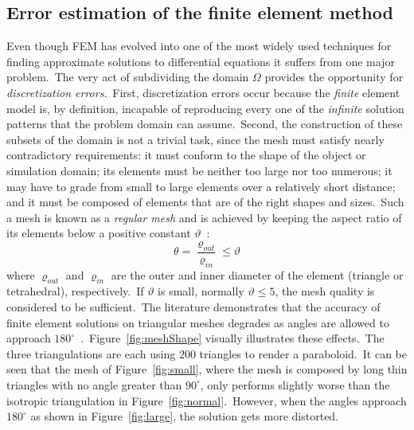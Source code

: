 \subsection{Error estimation of the finite element method}
\label{sec:errorEstimationOfTheFiniteelementMethod}
Even though FEM has evolved into one of the most widely used techniques for finding approximate solutions to differential equations it suffers from one major problem.\ The very act of subdividing the domain $\Omega$ provides the opportunity for \emph{discretization errors}.\ First, discretization errors occur because the \emph{finite} element model is, by definition, incapable of reproducing every one of the \emph{infinite} solution patterns that the problem domain can assume.\ Second, the construction of these subsets of the domain is not a trivial task, since the mesh must satisfy nearly contradictory requirements: it must conform to the shape of the object or simulation domain; its elements must be neither too large nor too numerous; it may have to grade from small to large elements over a relatively short distance; and it must be composed of elements that are of the right shapes and sizes.\ Such a mesh is known as a \textit{regular mesh} and is achieved by keeping the aspect ratio of its elements below a positive constant $\vartheta$~\cite{Cheng2012}:\
\begin{equation}
	\theta = \frac{\varrho_{out}}{\varrho_{in}} \leq \vartheta
	\label{eqn:meshRegularity}
\end{equation}
where $\varrho_{out}$ and $\varrho_{in}$ are the outer and inner diameter of the element (triangle or tetrahedral), respectively.\ If $\vartheta$ is small, normally $\vartheta\leq 5$, the mesh quality is considered to be sufficient.\ The literature demonstrates that the accuracy of finite element solutions on triangular meshes degrades as angles are allowed to approach $180^{\circ}$~\cite{Cheng2012}.\ Figure~\ref{fig:meshShape} visually illustrates these effects.\ The three triangulations are each using $200$ triangles to render a paraboloid.\ It can be seen that the mesh of Figure~\ref{fig:small}, where the mesh is composed by long thin triangles with no angle greater than $90^{\circ}$, only performs slightly worse than the isotropic triangulation in Figure~\ref{fig:normal}.\ However, when the angles approach $180^{\circ}$ as shown in Figure~\ref{fig:large}, the solution gets more distorted.\
